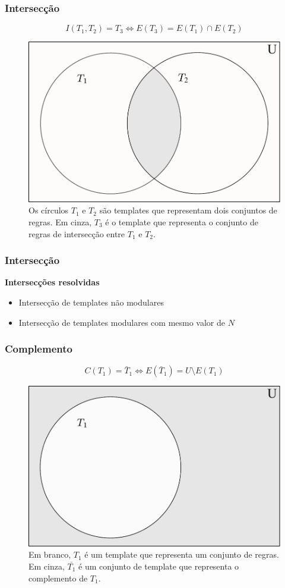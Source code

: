 \documentclass[aspectratio=43,hyperref={pdfpagelabels=false}]{beamer}
\begin{document}
\begin{frame}
	\frametitle{Intersecção}
	\begin{equation}
	I(T_1,T_2)=T_3 \Leftrightarrow E(T_3) = E(T_1) \cap E(T_2)
	\end{equation}

    \begin{figure}[h!]
      \centering
      \includegraphics[width=.4\textwidth]{fig_intersection.pdf}
      \caption{Os círculos $T_1$ e $T_2$ são templates que representam dois conjuntos de regras. Em cinza, $T_3$ é o template que representa o conjunto de regras de intersecção entre $T_1$ e $T_2$.}
      \label{fig:intersection}
    \end{figure}        

 \end{frame}

 \begin{frame}
    \frametitle{Intersecção}

    \textbf{Intersecções resolvidas}
    \begin{itemize}
      \item Intersecção de templates não modulares
      \item Intersecção de templates modulares com mesmo valor de $N$
    \end{itemize}
 \end{frame}

\begin{frame}
    \frametitle{Complemento}
    \begin{equation}
    C(T_1)=\bar{T}_1 \Leftrightarrow E(\bar{T}_1) = U \setminus E(T_1)
    \end{equation}

    \begin{figure}[h!]
      \centering
      \includegraphics[width=.4\textwidth]{fig_complement3.pdf}
      \caption{Em branco, $T_1$ é um template que representa um conjunto de regras. Em cinza, $\bar{T_1}$ é um conjunto de template que representa o complemento de $T_1$.}
      \label{fig:complement}
    \end{figure}    
 \end{frame}
\end{document}

